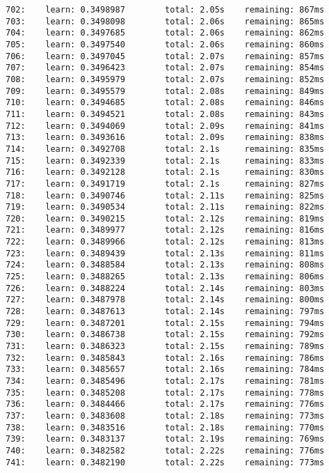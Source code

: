 \documentclass[11pt]{article}
\begin{document}
\begin{Verbatim}[commandchars=\\\{\}]
702:    learn: 0.3498987        total: 2.05s    remaining: 867ms
703:    learn: 0.3498098        total: 2.06s    remaining: 865ms
704:    learn: 0.3497685        total: 2.06s    remaining: 862ms
705:    learn: 0.3497540        total: 2.06s    remaining: 860ms
706:    learn: 0.3497045        total: 2.07s    remaining: 857ms
707:    learn: 0.3496423        total: 2.07s    remaining: 854ms
708:    learn: 0.3495979        total: 2.07s    remaining: 852ms
709:    learn: 0.3495579        total: 2.08s    remaining: 849ms
710:    learn: 0.3494685        total: 2.08s    remaining: 846ms
711:    learn: 0.3494521        total: 2.08s    remaining: 843ms
712:    learn: 0.3494069        total: 2.09s    remaining: 841ms
713:    learn: 0.3493616        total: 2.09s    remaining: 838ms
714:    learn: 0.3492708        total: 2.1s     remaining: 835ms
715:    learn: 0.3492339        total: 2.1s     remaining: 833ms
716:    learn: 0.3492128        total: 2.1s     remaining: 830ms
717:    learn: 0.3491719        total: 2.1s     remaining: 827ms
718:    learn: 0.3490746        total: 2.11s    remaining: 825ms
719:    learn: 0.3490534        total: 2.11s    remaining: 822ms
720:    learn: 0.3490215        total: 2.12s    remaining: 819ms
721:    learn: 0.3489977        total: 2.12s    remaining: 816ms
722:    learn: 0.3489966        total: 2.12s    remaining: 813ms
723:    learn: 0.3489439        total: 2.13s    remaining: 811ms
724:    learn: 0.3488584        total: 2.13s    remaining: 808ms
725:    learn: 0.3488265        total: 2.13s    remaining: 806ms
726:    learn: 0.3488224        total: 2.14s    remaining: 803ms
727:    learn: 0.3487978        total: 2.14s    remaining: 800ms
728:    learn: 0.3487613        total: 2.14s    remaining: 797ms
729:    learn: 0.3487201        total: 2.15s    remaining: 794ms
730:    learn: 0.3486738        total: 2.15s    remaining: 792ms
731:    learn: 0.3486323        total: 2.15s    remaining: 789ms
732:    learn: 0.3485843        total: 2.16s    remaining: 786ms
733:    learn: 0.3485657        total: 2.16s    remaining: 784ms
734:    learn: 0.3485496        total: 2.17s    remaining: 781ms
735:    learn: 0.3485208        total: 2.17s    remaining: 778ms
736:    learn: 0.3484466        total: 2.17s    remaining: 776ms
737:    learn: 0.3483608        total: 2.18s    remaining: 773ms
738:    learn: 0.3483516        total: 2.18s    remaining: 770ms
739:    learn: 0.3483137        total: 2.19s    remaining: 769ms
740:    learn: 0.3482582        total: 2.22s    remaining: 776ms
741:    learn: 0.3482190        total: 2.22s    remaining: 773ms

\end{Verbatim}
\end{document}
